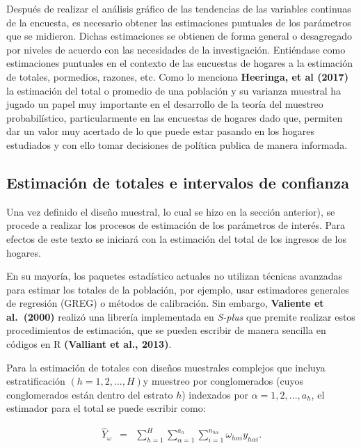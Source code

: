 \documentclass[
  12pt,
]{book}
\begin{document}
Después de realizar el análisis gráfico de las tendencias de las variables continuas de la encuesta, es necesario obtener las estimaciones puntuales de los parámetros que se midieron. Dichas estimaciones se obtienen de forma general o desagregado por niveles de acuerdo con las necesidades de la investigación. Entiéndase como estimaciones puntuales en el contexto de las encuestas de hogares a la estimación de totales, pormedios, razones, etc. Como lo menciona \textbf{Heeringa, et al (2017)} la estimación del total o promedio de una población y su varianza muestral ha jugado un papel muy importante en el desarrollo de la teoría del muestreo probabilístico, particularmente en las encuestas de hogares dado que, permiten dar un valor muy acertado de lo que puede estar pasando en los hogares estudiados y con ello tomar decisiones de política publica de manera informada.

\hypertarget{estimaciuxf3n-de-totales-e-intervalos-de-confianza}{%
\subsection{Estimación de totales e intervalos de confianza}\label{estimaciuxf3n-de-totales-e-intervalos-de-confianza}}

Una vez definido el diseño muestral, lo cual se hizo en la sección anterior), se procede a realizar los procesos de estimación de los parámetros de interés. Para efectos de este texto se iniciará con la estimación del total de los ingresos de los hogares.

En su mayoría, los paquetes estadístico actuales no utilizan técnicas avanzadas para estimar los totales de la población, por ejemplo, usar estimadores generales de regresión (GREG) o métodos de calibración. Sin embargo, \textbf{Valiente et al.~(2000)} realizó una librería implementada en \emph{S-plus} que premite realizar estos procedimientos de estimación, que se pueden escribir de manera sencilla en códigos en R \textbf{(Valliant et al., 2013)}.

Para la estimación de totales con diseños muestrales complejos que incluya estratificación \(\left(h=1,2,...,H\right)\)y muestreo por conglomerados (cuyos conglomerados están dentro del estrato \(h\)) indexados por \(\alpha=1,2,...,a_{h}\), el estimador para el total se puede escribir como:

\begin{eqnarray*}
\hat{Y}_{\omega} & = & \sum_{h=1}^{H}\sum_{\alpha=1}^{a_{h}}\sum_{i=1}^{n_{h\alpha}}\omega_{h\alpha i}y_{h\alpha i}.
\end{eqnarray*}
\end{document}
